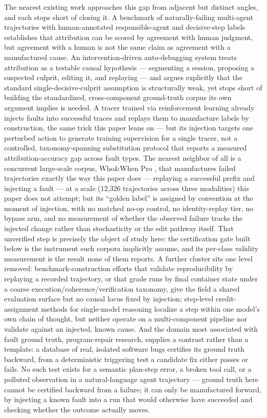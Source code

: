 \documentclass[11pt]{article}
\begin{document}
The nearest existing work approaches this gap from adjacent but distinct angles, and each stops short of closing it. A benchmark of naturally-failing multi-agent trajectories with human-annotated responsible-agent and decisive-step labels establishes that attribution can be scored by agreement with human judgment, but agreement with a human is not the same claim as agreement with a manufactured cause. An intervention-driven auto-debugging system treats attribution as a testable causal hypothesis --- segmenting a session, proposing a suspected culprit, editing it, and replaying --- and argues explicitly that the standard single-decisive-culprit assumption is structurally weak, yet stops short of building the standardized, cross-component ground-truth corpus its own argument implies is needed. A tracer trained via reinforcement learning already injects faults into successful traces and replays them to manufacture labels by construction, the same trick this paper leans on --- but its injection targets one perturbed action to generate training supervision for a single tracer, not a controlled, taxonomy-spanning substitution protocol that reports a measured attribution-accuracy gap across fault types. The nearest neighbor of all is a concurrent large-scale corpus, Who\&When Pro \citep{WhoAndWhenPro2026}, that manufactures failed trajectories exactly the way this paper does --- replaying a successful prefix and injecting a fault --- at a scale (12{,}326 trajectories across three modalities) this paper does not attempt; but its ``golden label'' is assigned by convention at the moment of injection, with no matched no-op control, no identity-replay tier, no bypass arm, and no measurement of whether the observed failure tracks the injected change rather than stochasticity or the edit pathway itself. That unverified step is precisely the object of study here: the certification gate built below is the instrument such corpora implicitly assume, and its per-class validity measurement is the result none of them reports. A further cluster sits one level removed: benchmark-construction efforts that validate reproducibility by replaying a recorded trajectory, or that grade runs by final container state under a coarse execution/coherence/verification taxonomy, give the field a shared evaluation surface but no causal locus fixed by injection; step-level credit-assignment methods for single-model reasoning localize a step within one model's own chain of thought, but neither operate on a multi-component pipeline nor validate against an injected, known cause. And the domain most associated with fault ground truth, program-repair research, supplies a contrast rather than a template: a database of real, isolated software bugs certifies its ground truth backward, from a deterministic triggering test a candidate fix either passes or fails. No such test exists for a semantic plan-step error, a broken tool call, or a polluted observation in a natural-language agent trajectory --- ground truth here cannot be certified backward from a failure; it can only be manufactured forward, by injecting a known fault into a run that would otherwise have succeeded and checking whether the outcome actually moves.
\end{document}
